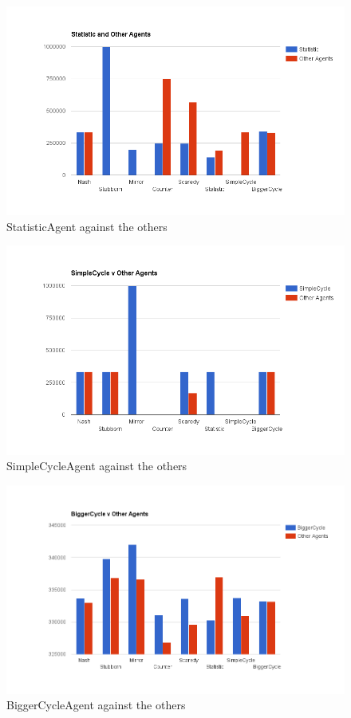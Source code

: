 \documentclass[12pt]{article}
\begin{document}
\begin{figure}[h]
\caption{StatisticAgent against the others}
\includegraphics[width=\textwidth]{images/statistic.png}
\end{figure}

\begin{figure}[h]
\caption{SimpleCycleAgent against the others}
\includegraphics[width=\textwidth]{images/simple_cycle.png}
\end{figure}

\begin{figure}[h]
\caption{BiggerCycleAgent against the others}
\includegraphics[width=\textwidth]{images/bigger_cycle.png}
\end{figure}
\end{document}
